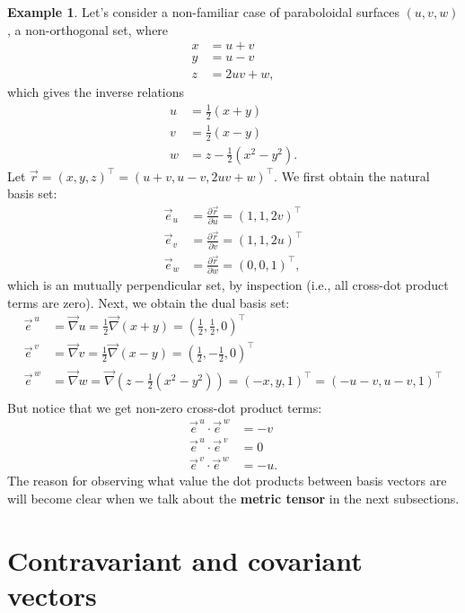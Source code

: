 \documentclass{book}
\theoremstyle{definition}
\newtheorem{exmp}{Example}[section]
\begin{document}
\begin{exmp}
Let's consider a non-familiar case of paraboloidal surfaces $(u,v,w)$, a non-orthogonal set, where
\begin{align*}
x &= u+v\\y&=u-v\\z&=2uv+w,
\end{align*}
which gives the inverse relations
\begin{align*}
u&=\frac{1}{2}(x+y)\\
v&=\frac{1}{2}(x-y)\\
w&=z-\frac{1}{2}(x^2-y^2).
\end{align*}
Let $\vec{r} = (x,y,z)^\top = (u+v, u-v, 2uv + w)^\top$. We first obtain the natural basis set:
\begin{align*}
\vec{e}_u &= \frac{\partial \vec{r}}{\partial u} = (1,1,2v)^\top \\
\vec{e}_v &= \frac{\partial \vec{r}}{\partial v} = (1,1,2u)^\top \\
\vec{e}_w &= \frac{\partial \vec{r}}{\partial w} = (0,0,1)^\top, 
\end{align*}
which is an mutually perpendicular set, by inspection (i.e., all cross-dot product terms are zero). Next, we obtain the dual basis set:
\begin{align*}
\vec{e}^{\,u} &= \vec{\nabla}u = \frac{1}{2}\vec{\nabla}(x+y) = \left( \frac{1}{2}, \frac{1}{2},0\right) ^\top\\
\vec{e}^{\,v} &= \vec{\nabla}v = \frac{1}{2}\vec{\nabla}(x-y) = \left( \frac{1}{2}, -\frac{1}{2},0\right) ^\top\\
\vec{e}^{\,w} &= \vec{\nabla}w = \vec{\nabla}\left( z-\frac{1}{2}(x^2-y^2)\right)  = (-x,y,1)^\top = (-u-v,u-v,1)^\top\\
\end{align*}
But notice that we get non-zero cross-dot product terms:
\begin{align*}
\vec{e}^{\,u}\cdot\vec{e}^{\,w} &= -v \\
\vec{e}^{\,u}\cdot\vec{e}^{\,v} &= 0 \\
\vec{e}^{\,v}\cdot\vec{e}^{\,w} &= -u. 
\end{align*}
The reason for observing what value the dot products between basis vectors are will become clear when we talk about the \textbf{metric tensor} in the next subsections.
\end{exmp}
\section{Contravariant and covariant vectors}
\end{document}
